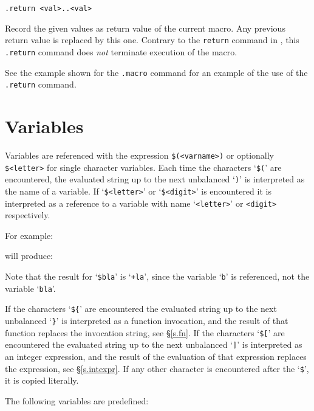 \begin{verbatim}
.return <val>..<val>
\end{verbatim}
\begin{desc}
Record the given values as return value of the current macro.
Any previous return value is replaced by this one.
Contrary to the \texttt{return} command in {\C}, this \verb+.return+
command does \emph{not} terminate execution of the macro.

See the example shown for the \verb'.macro' command for an example of the
use of the \verb'.return' command.
\end{desc}
\section{Variables}
Variables are referenced with the expression
\texttt{\$(<varname>)} or optionally \texttt{\$<letter>} for single character
variables.
Each time the characters `\texttt{\$(}' are encountered,
the evaluated string up to the next unbalanced `\texttt{)}' 
is interpreted as the name of a variable.
If `\texttt{\$<letter>}' or `\texttt{\$<digit>}' is encountered it is interpreted as
a reference to a variable with name `\texttt{<letter>}' or \texttt{<digit>}
respectively.

For example:
\begin{showfile}

\end{showfile}
will produce:
\begin{showfile}

\end{showfile}
Note that the result for `\verb+$bla+' is `\texttt{+la}', since the
variable `\texttt{b}' is referenced, not the variable `\texttt{bla}'.

If the characters `\texttt{\$\{}' are encountered the evaluated string up to
the next unbalanced `\texttt{\}}' is interpreted as a function invocation,
and the result of that function replaces the invocation string,
see \S\ref{s.fn}.
If the characters `\texttt{\$[}' are encountered the evaluated string up
to the next unbalanced `\texttt{]}' is interpreted as an integer expression,
and the result of the evaluation of that expression replaces the expression,
see \S\ref{s.intexpr}.
If any other character is encountered after the `\texttt{\$}',
it is copied literally.

The following variables are predefined:

